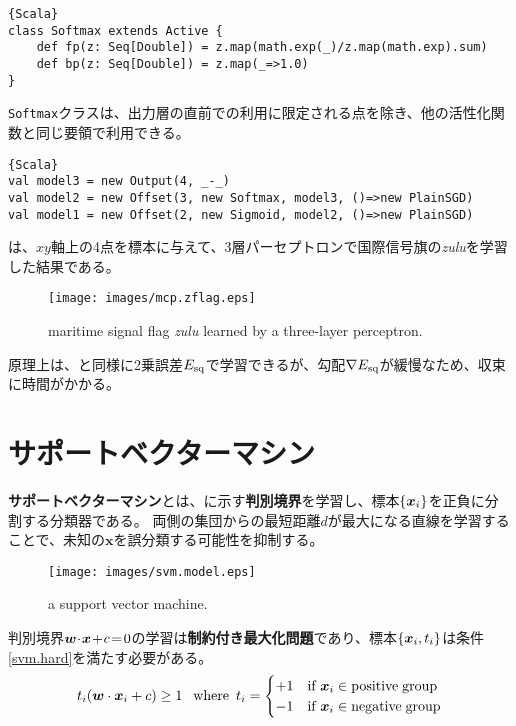 \documentclass[10pt,a4paper]{book}
\begin{document}
\begin{Verbatim}{Scala}
class Softmax extends Active {
	def fp(z: Seq[Double]) = z.map(math.exp(_)/z.map(math.exp).sum)
	def bp(z: Seq[Double]) = z.map(_=>1.0)
}
\end{Verbatim}

\texttt{Softmax}クラスは、出力層の直前での利用に限定される点を除き、他の活性化関数と同じ要領で利用できる。

\begin{Verbatim}{Scala}
val model3 = new Output(4, _-_)
val model2 = new Offset(3, new Softmax, model3, ()=>new PlainSGD)
val model1 = new Offset(2, new Sigmoid, model2, ()=>new PlainSGD)
\end{Verbatim}

は、$xy$軸上の4点を標本に与えて、3層パーセプトロンで国際信号旗の\textit{zulu}を学習した結果である。

\begin{figure}[h]
\centering
\texttt{[image: images/mcp.zflag.eps]}
\caption{maritime signal flag \textit{zulu} learned by a three-layer perceptron.\label{fig:mcp.zflag}}
\end{figure}

原理上は、と同様に2乗誤差$E_\mathrm{sq}$で学習できるが、勾配$\nabla{}E_\mathrm{sq}$が緩慢なため、収束に時間がかかる。

\chapter{サポートベクターマシン\label{chap:svm}}

\textbf{サポートベクターマシン}とは、に示す\textbf{判別境界}を学習し、標本$\seq{\bm{x}_i}$を正負に分割する分類器である。
両側の集団からの最短距離$d$が最大になる直線を学習することで、未知の$\bm{x}$を誤分類する可能性を抑制する。

\begin{figure}[h]
\centering
\texttt{[image: images/svm.model.eps]}
\caption{a support vector machine.\label{fig:svm}}
\end{figure}

判別境界$\bm{w}\! \cdot \!\bm{x}\!+\!c\!=\!0$の学習は\textbf{制約付き最大化問題}であり、標本$\seq{\bm{x}_i,t_i}$は条件\eqref{svm.hard}を満たす必要がある。
%
\begin{equation}
\label{eq:svm.hard}
t_i(\bm{w} \cdot \bm{x}_i + c) \geq 1\;
\enspace\mathrm{where}\enspace t_i=
\begin{cases}
+1 & \text{if $\bm{x}_i\in\mathrm{positive\;group}$} \\
-1 & \text{if $\bm{x}_i\in\mathrm{negative\;group}$}
\end{cases}
\end{equation}
\end{document}
